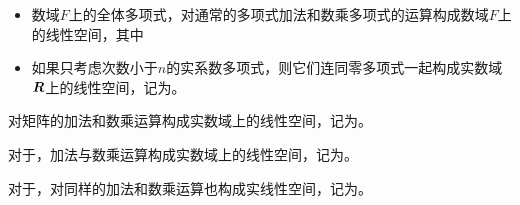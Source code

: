 \begin{frame}
  \begin{li} 
    \begin{itemize}
    \item 数域$F$上的全体多项式，对通常的多项式加法和数乘多项式的运算构成数域$F$上的线性空间，其中\\[0.15in]
    \item 如果只考虑次数小于$n$的实系数多项式，则它们连同零多项式一起构成实数域$\boldsymbol{R}$上的线性空间，记为。
    \end{itemize}
    
  \end{li}
\end{frame}

\begin{frame}
  \begin{li} 
    对矩阵的加法和数乘运算构成实数域上的线性空间，记为。
  \end{li} 
\end{frame}

\begin{frame}
  \begin{li}
    对于，加法与数乘运算构成实数域上的线性空间，记为。  \vspace{.2in}

    对于，对同样的加法和数乘运算也构成实线性空间，记为。
  \end{li} 
\end{frame}


